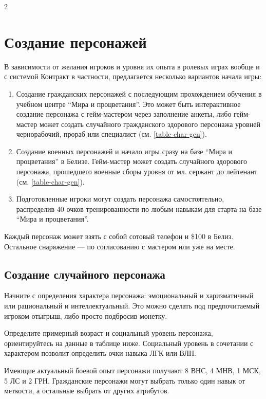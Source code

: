 \documentclass{article}
\begin{document}
\begin{multicols}{2}
\section{Создание персонажей}\label{character-creation}

В зависимости от желания игроков и уровня их опыта в ролевых играх вообще и с системой Контракт в частности, предлагается несколько вариантов начала игры:

\begin{enumerate}
\def\labelenumi{\arabic{enumi}.}
\item
  Создание гражданских персонажей с последующим прохождением обучения в учебном центре ``Мира и процветания''. Это может быть интерактивное создание персонажа с гейм-мастером через заполнение анкеты, либо гейм-мастер может создать случайного гражданского здорового персонажа уровней чернорабочий, прораб или специалист (см. \autoref{table-char-gen}).
\item
  Создание военных персонажей и начало игры сразу на базе ``Мира и процветания'' в Белизе. Гейм-мастер может создать случайного здорового персонажа, прошедшего военные сборы уровня от мл. сержант до лейтенант (см. \autoref{table-char-gen}).
\item
  Подготовленные игроки могут создать персонажа самостоятельно, распределив 40 очков тренированности по любым навыкам для старта на базе ``Мира и процветания''.
\end{enumerate}

Каждый персонаж может взять с собой сотовый телефон и \$100 в Белиз. Остальное снаряжение --- по согласованию с мастером или уже на месте.

\subsection{Создание случайного персонажа}\label{char-gen}

Начните с определения характера персонажа: эмоциональный и харизматичный или рациональный и интеллектуальный.
Это можно сделать под предпочитаемый игроком отыгрыш, либо просто подбросив монетку.

Определите примерный возраст и социальный уровень персонажа, ориентируйтесь на данные в таблице ниже.
Социальный уровень в сочетании с характером позволит определить очки навыка ЛГК или ВЛН.

Имеющие актуальный боевой опыт персонажи получают 8 ВНС, 4 МНВ, 1 МСК, 5 ЛС и 2 ГРН.
Гражданские персонажи могут выбрать только один навык от меткости, а остальные выбрать от других атрибутов.


\end{multicols}
\end{document}
